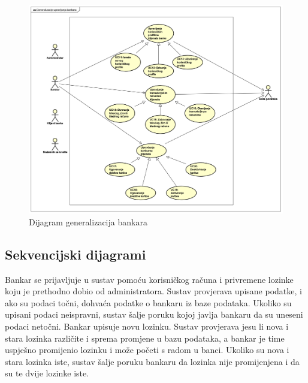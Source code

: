 				\begin{figure}[H]
					\includegraphics[scale=0.4]{slike/UseCase Diagram1Matija.PNG}
					\centering
					\caption{Dijagram generalizacija bankara}
					\label{fig:ucd1Matija}
				\end{figure}
				\eject		
				
			\subsection{Sekvencijski dijagrami}
				
				
				Bankar se prijavljuje u sustav pomoću korisničkog računa i privremene lozinke koju je prethodno dobio od administratora. Sustav provjerava upisane podatke, i ako su podaci točni, dohvaća podatke o bankaru iz baze podataka. Ukoliko su upisani podaci neispravni, sustav šalje poruku kojoj javlja bankaru da su uneseni podaci netočni. Bankar upisuje novu lozinku. Sustav provjerava jesu li nova i stara lozinka različite i  sprema promjene u bazu podataka, a bankar je time uspješno promijenio lozinku i može početi s radom u banci. Ukoliko su nova i stara lozinka iste, sustav šalje poruku bankaru da lozinka nije promijenjena i da su te dvije lozinke iste.
				\eject
				
